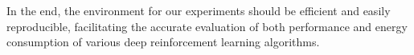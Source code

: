 In the end, the environment for our experiments should be efficient and easily reproducible, facilitating the accurate evaluation of both performance and energy consumption of various deep reinforcement learning algorithms.
%
%
%
